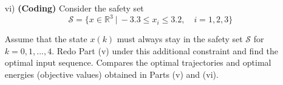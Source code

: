 \begin{homeworkProblem}
\begin{itemize}
        \item [vi)] \textbf{(Coding)} Consider the safety set 
            \begin{equation}
                \mathcal S=\{x \in \mathbb R^3 \ | \ -3.3 \leq x_i \leq 3.2,
                \quad i=1,2,3\}
            \end{equation}
            
            Assume that the state $x(k)$ must always stay in the safety set 
            $\mathcal S$ for $k=0,1,...,4$. Redo Part (v) under this additional 
            constraint and find the optimal input sequence. Compares the 
            optimal trajectories and optimal energies (objective values) 
            obtained in Parts (v) and (vi). 
    \end{itemize}


\end{homeworkProblem}